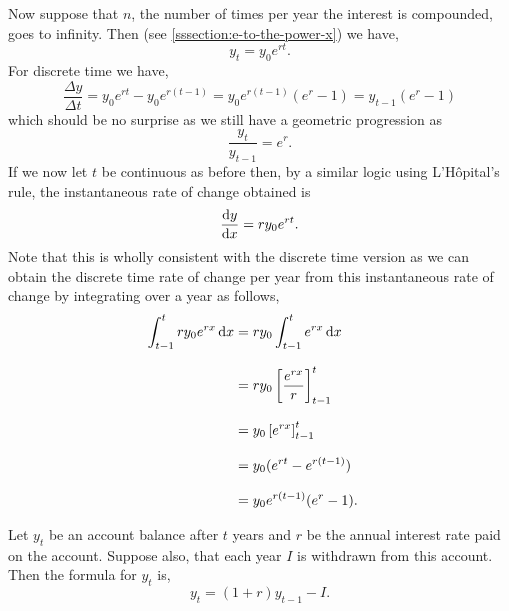 \documentclass[MathsNotesBase.tex]{subfiles}
\begin{document}
{\begin{exe}
{				Now suppose that $n$, the number of times per year the interest is compounded, goes to infinity. Then (see \autoref{sssection:e-to-the-power-x}) we have,
				\[ y_t = y_0 e^{rt}. \]
				For discrete time we have,
				\[ \frac{\Delta y}{\Delta t} = y_0 e^{rt} - y_0 e^{r(t-1)} = y_0 e^{r(t-1)} (e^r - 1) = y_{t-1} (e^r - 1) \]
				which should be no surprise as we still have a geometric progression as
				\[ \frac{y_t}{y_{t-1}} = e^r. \]
				If we now let $t$ be continuous as before then, by a similar logic using L'H\^{o}pital's rule, the instantaneous rate of change obtained is
				\[ \frac{\dif y}{\dif x} = r y_0 e^{rt}. \]
				Note that this is wholly consistent with the discrete time version as we can obtain the discrete time rate of change per year from this instantaneous rate of change by integrating over a year as follows,
				\begin{align*}
				\int_{t-1}^t r y_0 e^{rx} \dif x &= r y_0 \int_{t-1}^t e^{rx} \dif x \\[8pt]
				&= r y_0 \left[\frac{e^{rx}}{r}\right]_{t-1}^t &\sidecomment{} \\[8pt]
				&= y_0 \left[e^{rx}\right]_{t-1}^t &\sidecomment{} \\[8pt]
				&= y_0 (e^{rt} - e^{r(t-1)}) &\sidecomment{} \\[8pt]
				&= y_0  e^{r(t-1)} (e^r - 1). &\sidecomment{}
				\end{align*}
			\bigskip}
			\item{Let $y_t$ be an account balance after $t$ years and $r$ be the annual interest rate paid on the account. Suppose also, that each year $I$ is withdrawn from this account. Then the formula for $y_t$ is,
				\[ y_t = (1 + r)y_{t-1} - I. \]
			}
		\end{exe}
	
	
		\biggerskip
}
\end{document}
